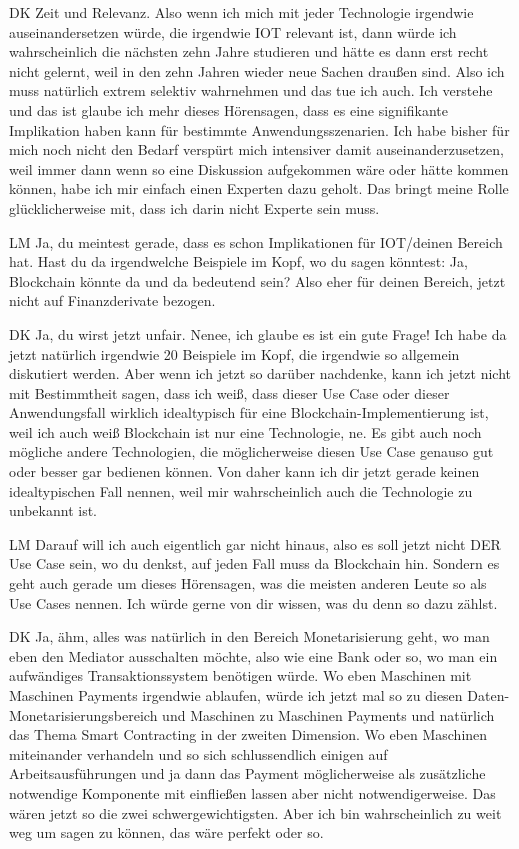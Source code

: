 \begin{xlist}
     \item[DK] Zeit und Relevanz. Also wenn ich mich mit jeder Technologie irgendwie auseinandersetzen würde, die irgendwie IOT relevant ist, dann würde ich wahrscheinlich die nächsten zehn Jahre studieren und hätte es dann erst recht nicht gelernt, weil in den zehn Jahren wieder neue Sachen draußen sind. Also ich muss natürlich extrem selektiv wahrnehmen und das tue ich auch. Ich verstehe und das ist glaube ich mehr dieses Hörensagen, dass es eine signifikante Implikation haben kann für bestimmte Anwendungsszenarien. Ich habe bisher für mich noch nicht den Bedarf verspürt mich intensiver damit auseinanderzusetzen, weil immer dann wenn so eine Diskussion aufgekommen wäre oder hätte kommen können, habe ich mir einfach einen Experten dazu geholt. Das bringt meine Rolle glücklicherweise mit, dass ich darin nicht Experte sein muss.
     \item[LM] Ja, du meintest gerade, dass es schon Implikationen für IOT/deinen Bereich hat. Hast du da irgendwelche Beispiele im Kopf, wo du sagen könntest: Ja, Blockchain könnte da und da bedeutend sein? Also eher für deinen Bereich, jetzt nicht auf Finanzderivate bezogen.
     \item[DK] Ja, du wirst jetzt unfair. Nenee, ich glaube es ist ein gute Frage! Ich habe da jetzt natürlich irgendwie 20 Beispiele im Kopf, die irgendwie so allgemein diskutiert werden. Aber wenn ich jetzt so darüber nachdenke, kann ich jetzt nicht mit Bestimmtheit sagen, dass ich weiß, dass dieser Use Case oder dieser Anwendungsfall wirklich idealtypisch für eine Blockchain-Implementierung ist, weil ich auch weiß Blockchain ist nur eine Technologie, ne. Es gibt auch noch mögliche andere Technologien, die möglicherweise diesen Use Case genauso gut oder besser gar bedienen können. Von daher kann ich dir jetzt gerade keinen idealtypischen Fall nennen, weil mir wahrscheinlich auch die Technologie zu unbekannt ist.
     \item[LM] Darauf will ich auch eigentlich gar nicht hinaus, also es soll jetzt nicht DER Use Case sein, wo du denkst, auf jeden Fall muss da Blockchain hin. Sondern es geht auch gerade um dieses Hörensagen, was die meisten anderen Leute so als Use Cases nennen. Ich würde gerne von dir wissen, was du denn so dazu zählst.
     \item[DK] Ja, ähm, alles was natürlich in den Bereich Monetarisierung geht, wo man eben den Mediator ausschalten möchte, also wie eine Bank oder so, wo man ein aufwändiges Transaktionssystem benötigen würde. Wo eben Maschinen mit Maschinen Payments irgendwie ablaufen, würde ich jetzt mal so zu diesen Daten-Monetarisierungsbereich und Maschinen zu Maschinen Payments und natürlich das Thema Smart Contracting in der zweiten Dimension. Wo eben Maschinen miteinander verhandeln und so sich schlussendlich einigen auf Arbeitsausführungen und ja dann das Payment möglicherweise als zusätzliche notwendige Komponente mit einfließen lassen aber nicht notwendigerweise. Das wären jetzt so die zwei schwergewichtigsten. Aber ich bin wahrscheinlich zu weit weg um sagen zu können, das wäre perfekt oder so.

\end{xlist}
